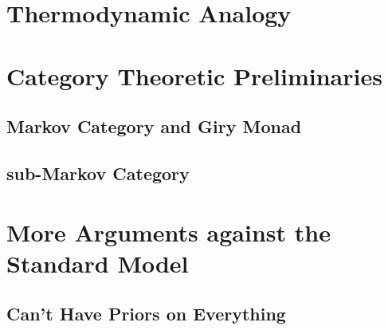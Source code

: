 \documentclass{article}
\begin{document}
	\section{Thermodynamic Analogy}
	
	
	\appendix
	\section{Category Theoretic Preliminaries}
	\subsection{Markov Category and Giry Monad}
	
	\subsection{sub-Markov Category}
	
	\section{More Arguments against the Standard Model} %
	
	\subsection{Can't Have Priors on Everything}\label{sec:impossible-prior}
	
	
		
	
	
\end{document}
